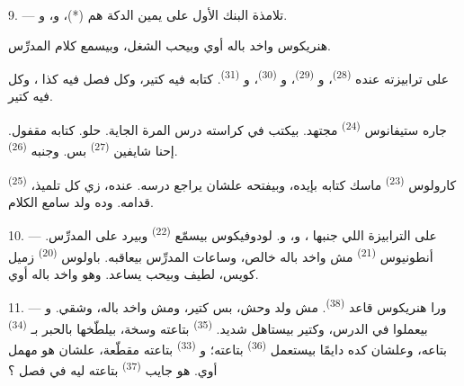 
\VUsaut{2.4mm}

\VUsaut{3.0mm}

9. --- تلامذة البنك الأول على يمين الدكة هم  (*)،
و، و.

هنريكوس واخد باله أوي وبيحب الشغل، وبيسمع كلام المدرِّس.

على ترابيزته عنده  \textsuperscript{(28)}، و
\textsuperscript{(29)}، و \textsuperscript{(30)}، و
\textsuperscript{(31)}. كتابه فيه  كتير، وكل فصل فيه كذا
، وكل  فيه  كتير.

جاره ستيفانوس \textsuperscript{(24)} مجتهد. بيكتب في كراسته درس المرة الجاية.
 حلو. كتابه مقفول. إحنا شايفين 
\textsuperscript{(27)} بس. وجنبه  \textsuperscript{(26)}.

كارولوس \textsuperscript{(23)} ماسك كتابه بإيده، وبيفتحه علشان يراجع درسه. عنده،
زي كل تلميذ،  \textsuperscript{(25)} قدامه. وده ولد سامع الكلام.

10. --- على الترابيزة اللي جنبها ، و،
و. لودوفيكوس بيسمّع  \textsuperscript{(22)} وبيرد على
 المدرِّس. أنطونيوس \textsuperscript{(21)} مش واخد باله خالص، وساعات
المدرِّس بيعاقبه. باولوس \textsuperscript{(20)} زميل كويس، لطيف وبيحب يساعد. وهو
واخد باله أوي.

\VUsaut{4.2mm}
\VUsaut{3.2mm}

11. --- ورا هنريكوس قاعد  \textsuperscript{(38)}. مش ولد وحش،
بس  كتير، ومش واخد باله، وشقي. 
و بيعملوا  في الدرس، وكتير بيستاهل 
شديد.  \textsuperscript{(35)} بتاعته وسخة، بيلطّخها بالحبر
بـ \textsuperscript{(34)} بتاعه، وعلشان كده دايمًا بيستعمل
 \textsuperscript{(36)} بتاعته؛ و
\textsuperscript{(33)} بتاعته مقطّعة، علشان هو مهمل أوي. هو جايب  \textsuperscript{(37)} بتاعته ليه في فصل ؟

